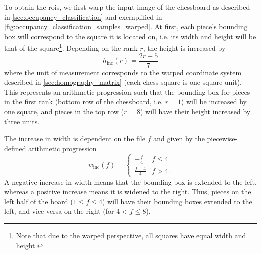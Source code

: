 \documentclass[../main.tex]{subfiles}
\begin{document}
To obtain the \glspl{roi}, we first warp the input image of the chessboard as described in \cref{sec:occupancy_classification} and exemplified in \cref{fig:occupancy_classification_samples_warped}.
At first, each piece's bounding box will correspond to the square it is located on, i.e. its width and height will be that of the square\footnote{Note that due to the warped perspective, all squares have equal width and height.}.
Depending on the rank $r$, the height is increased by
\begin{equation*}
    h_\text{inc}(r) = \frac{2r + 5}{7}
\end{equation*}
where the unit of measurement corresponds to the warped coordinate system described in \cref{sec:homography_matrix} (each chess square is one square unit).
This represents an arithmetic progression such that the bounding box for pieces in the first rank (bottom row of the chessboard, i.e. $r=1$) will be increased by one square, and pieces in the top row ($r=8$) will have their height increased by three units.

The increase in width is dependent on the file $f$ and given by the piecewise-defined arithmetic progression
\begin{equation*}
    w_\text{inc}(f) = \begin{cases}
        -\frac{f}{4} & f \leq 4 \\
        \frac{f-4}{4} & f > 4.
    \end{cases}
\end{equation*}
A negative increase in width means that the bounding box is extended to the left, whereas a positive increase means it is widened to the right.
Thus, pieces on the left half of the board ($1 \leq f \leq 4$) will have their bounding boxes extended to the left, and vice-versa on the right (for $4 < f \leq 8$).
\end{document}
